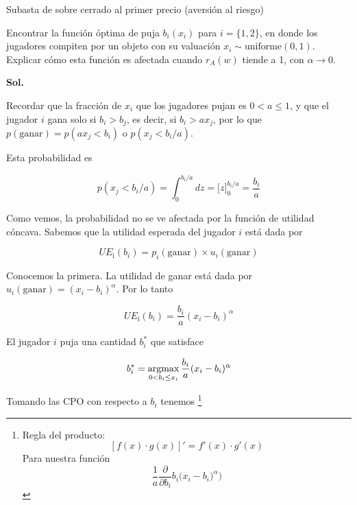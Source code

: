 \documentclass[12pt]{article}
\newcommand{\UE}[2]{UE_{\text{#1}}(#2)}
\begin{document}
\begin{exbox}{Subasta de sobre cerrado al primer precio (aversión al riesgo)}

	Encontrar la función óptima de puja $b_i(x_i)$ para $i=\{1, 2\}$, en donde los jugadores compiten por un objeto con su valuación $x_i \sim \text{uniforme}(0, 1)$. Explicar cómo esta función es afectada cuando $r_A(w)$ tiende a 1, con $\alpha \rightarrow 0$.

	\textbf{Sol.}

	Recordar que la fracción de $x_i$ que los jugadores pujan es $0 < a \leq 1$, y que el jugador $i$ gana solo si $b_i > b_j$, es decir, si $b_i > a x_j$, por lo que $p(\text{ganar}) = p(a x_j < b_i)$ o $p(x_j < b_i/a)$.

	Esta probabilidad es

	\[
		p(x_j < b_i/a) = \int_0^{b_i/a} dz = \Bigg[z\Bigg]_0^{b_i/a} = \frac{b_i}{a}
	\]

	\begin{center}
	\end{center}

	Como vemos, la probabilidad no se ve afectada por la función de utilidad cóncava. Sabemos que la utilidad esperada del jugador $i$ está dada por

	\[
		\UE{i}{b_i}=p_i(\text{ganar})\times u_i(\text{ganar})
	\]

	Conocemos la primera. La utilidad de ganar está dada por $u_i(\text{ganar})=(x_i - b_i)^\alpha$. Por lo tanto

	\[
		\UE{i}{b_i}=\frac{b_i}{a}(x_i - b_i)^\alpha
	\]

	El jugador $i$ puja una cantidad $b_i^*$ que satisface

	\[
		b_i^* = \operatorname*{argmax}_{0 < b_i \leq x_i}  \frac{b_i}{a}(x_i - b_i)^\alpha
	\]

	Tomando las CPO con respecto a $b_i$ tenemos%
	\footnote{
		Regla del producto: \[ [f(x)\cdot g(x)]'=f'(x)\cdot g'(x) \]
		Para nuestra función
		\[
			\frac{1}{a}\frac{\partial}{\partial b_i}b_i \Biggl(x_i - b_i)^\alpha\Biggr)
		\]

}
\end{exbox}
\end{document}
